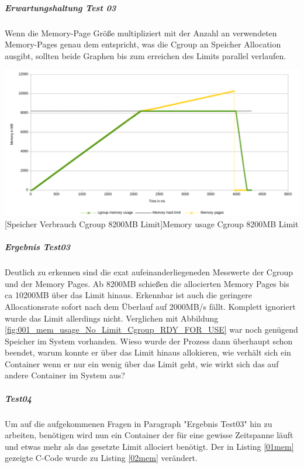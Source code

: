 \subparagraph{Erwartungshaltung Test 03}
Wenn die Memory-Page Größe multipliziert mit der Anzahl an verwendeten Memory-Pages genau dem entspricht, was die Cgroup an Speicher Allocation ausgibt, sollten beide Graphen bis zum erreichen des Limits parallel verlaufen.

\vspace{1em}
\begin{minipage}{\linewidth}
	\centering
	\includegraphics[width=1\linewidth]{pics/003_mem_usage_8200mb_limit_Cgroup_Pages_RDY_FOR_USE.png}
	[Speicher Verbrauch Cgroup 8200MB Limit]{Memory usage Cgroup 8200MB Limit}
	\label{fig:003_mem_usage_8200mb_limit_Cgroup_Pages_RDY_FOR_USE}
\end{minipage}

\subparagraph{Ergebnis Test03}
Deutlich zu erkennen sind die exat aufeinanderliegeneden Messwerte der Cgroup und der Memory Pages. Ab 8200MB schießen die allocierten Memory Pages bis ca 10200MB über das Limit hinaus. Erkennbar ist auch die geringere Allocationsrate sofort nach dem Überlauf auf 2000MB/s fällt. Komplett ignoriert wurde das Limit allerdings nicht. Verglichen mit Abbildung \ref{fig:001_mem_usage_No_Limit_Cgroup_RDY_FOR_USE} war noch genügend Speicher im System vorhanden. Wieso wurde der Prozess dann überhaupt schon beendet, warum konnte er über das Limit hinaus allokieren, wie verhält sich ein Container wenn er nur ein wenig über das Limit geht, wie wirkt sich das auf andere Container im System aus?

\subparagraph{Test04}
Um auf die aufgekommenen Fragen in Paragraph "Ergebnis Test03" hin zu arbeiten, benötigen wird nun ein Container der für eine gewisse Zeitspanne läuft und etwas mehr als das gesetzte Limit allociert benötigt. Der in Listing \ref{01mem} gezeigte C-Code wurde zu Listing \ref{02mem} verändert. 

\vspace{1em}


